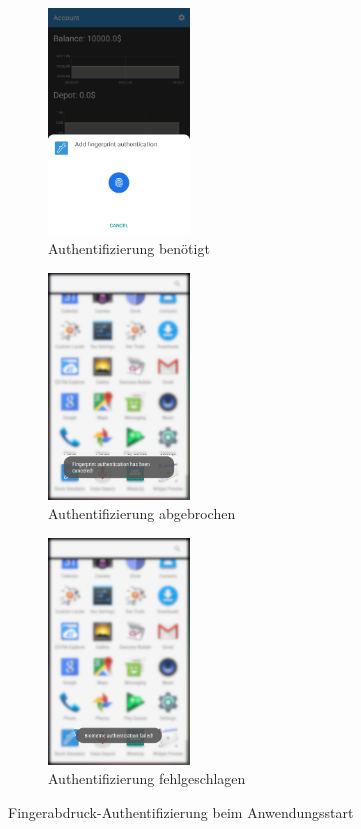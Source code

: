 \documentclass[a4paper]{article}
\begin{document}
\begin{figure}[H]
    \begin{subfigure}{.329\textwidth}
        \centering
        \includegraphics[height=6cm,keepaspectratio]{./images/account/fingerprint_required.png}
        \caption{Authentifizierung benötigt}
        \label{fig:functionality:account:fingerprint:dialog}
    \end{subfigure}
    \begin{subfigure}{.329\textwidth}
        \centering
        \includegraphics[height=6cm,keepaspectratio]{./images/account/fingerprint_required_cancel.png}
        \caption{Authentifizierung abgebrochen}
        \label{fig:functionality:account:fingerprint:cancel}
    \end{subfigure}
    \begin{subfigure}{.329\textwidth}
        \centering
        \includegraphics[height=6cm,keepaspectratio]{./images/account/fingerprint_required_wrong_finger.png}
        \caption{Authentifizierung fehlgeschlagen}
        \label{fig:functionality:account:fingerprint:failed}
    \end{subfigure}
    \caption{Fingerabdruck-Authentifizierung beim Anwendungsstart}
    \label{fig:functionality:account:fingerprint}
\end{figure}
\end{document}
